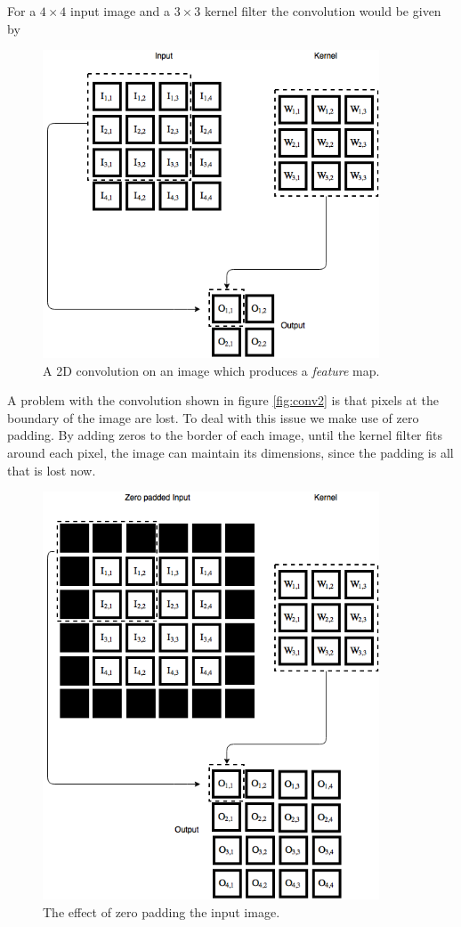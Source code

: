 \documentclass[11pt]{article}
\begin{document}
For a $4 \times 4$ input image and a $3 \times 3$ kernel filter the convolution
would be given by
\begin{figure}[!h]\label{fig:conv2}
    \centering
    \includegraphics[width=10cm]{include/conv_2.png}
    \caption{A 2D convolution on an image which produces a \textit{feature} map.}
    \label{fig:conv}
\end{figure}
\newpage
A problem with the convolution shown in figure \ref{fig:conv2} is that
pixels at the boundary of the image are lost.
To deal with this issue we make use of zero padding.
By adding zeros to the border of each image, until the kernel
filter fits around each pixel, the image can maintain its dimensions, since the
padding is all that is lost now.
\begin{figure}[H]
    \centering
    \includegraphics[width=10cm]{include/conv_2_zero_pad.png}
    \caption{The effect of zero padding the input image.}
    \label{fig:conv}
\end{figure}
\end{document}
